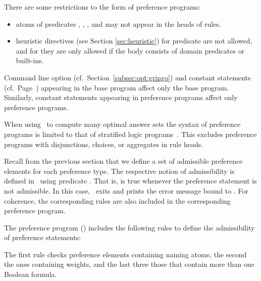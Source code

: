 \begin{note}
There are some restrictions to the form of preference programs: 
\begin{itemize}
\item 
atoms of predicates , , 
,  and 
may not appear in the heads of rules.%
\item
heuristic directives (see Section \ref{sec:heuristic}) for predicate  are not allowed, 
and for  they are only allowed if the body consists of domain predicates or built-ins.
\end{itemize}
\end{note}

\begin{note}
Command line option 
 (cf.\ Section~\ref{subsec:opt:gringo}) 
and
constant statements (cf.\ Page~\pageref{subset:gringo:meta:const})
appearing in the base program
affect only the base program.
%
Similarly, 
constant statements appearing in preference programs affect only preference programs.
\end{note}

\begin{note}
When using \asprin\ to compute many optimal answer sets the syntax of preference programs
is limited to that of stratified logic programs~\cite{apblwa87a}.
This excludes preference programs with disjunctions, choices, or aggregates in rule heads.
\end{note}

Recall from the previous section that we define a set of admissible preference elements for each preference type.
The respective notion of admissibility is defined in \asprin\ using predicate .
That is,  is true whenever the preference statement is not admissible.
In this case, \asprin\ exits and prints the error message bound to .
For coherence, the corresponding rules are also included in the corresponding preference program.
\begin{example}
The preference program ()
includes the following rules to define the admissibility of  preference statements:
%

%
The first rule checks preference elements containing naming atoms, 
the second the ones containing weights, 
and the last three those that contain more than one Boolean formula.
\end{example}

